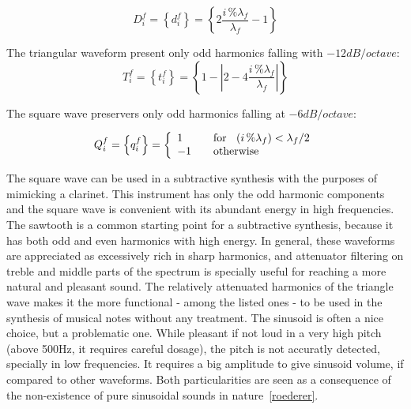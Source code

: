 \documentclass[
 aip,
 jmp,
 amsmath,amssymb,
 reprint,
]{revtex4-1}
\begin{document}
\begin{equation}\label{sawTooth}
     D^f_i=\left\{ d^f_i \right\}=\left\{ 2\frac{i\,\%\lambda_f}{\lambda_f} -1 \right\}
\end{equation}

The triangular waveform present only odd harmonics falling with $-12dB/octave$:
\begin{equation}\label{triangular}
     T^f_i=\left\{ t^f_i \right\}=\left\{1- \left| 2 - 4\frac{i\,\%\lambda_f}{\lambda_f} \right| \right\}
\end{equation}

The square wave preservers only odd harmonics falling at $-6dB/octave$:

\begin{equation}\label{square}
     Q^f_i=\left\{ q^f_i \right\}= \left\{
         \begin{array}{l l}
              1 & \quad \text{for } \; \; (i\,\%\lambda_f)   <  \lambda_f /2  \\
              -1 & \quad \text{otherwise}\\
         \end{array} \right.
\end{equation}


The square wave can be used in a subtractive synthesis with the purposes of mimicking a clarinet. This instrument has only the odd harmonic components and the square wave is convenient with its abundant energy in high frequencies.
The sawtooth is a common starting point for a subtractive synthesis, because it has both odd and even harmonics with high energy. In general, these waveforms are appreciated as excessively rich in sharp harmonics, and attenuator filtering on treble and middle parts of the spectrum is specially useful for reaching a more natural and pleasant sound. 
The relatively attenuated harmonics of the triangle wave makes it the more functional - among the listed ones - to be used in the synthesis of musical notes without any treatment. The sinusoid is often a nice choice, but a problematic one. While pleasant if not loud in a very high pitch (above 500Hz, it requires careful dosage), the pitch is not accuratly detected, specially in low frequencies. It requires a big amplitude to give sinusoid volume, if compared to other waveforms. Both particularities are seen as a consequence of the non-existence of pure sinusoidal sounds in nature~\ref{roederer}.
\end{document}
